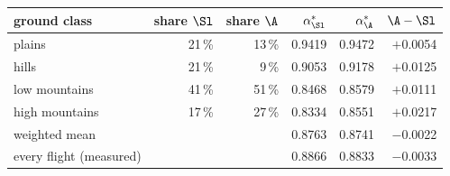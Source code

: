 \begin{tabular}{@{}l r r r r r@{}}
\toprule
ground class & share $\Sl$ & share $\A$ & $\alpha^*_\Sl$ & $\alpha^*_\A$ & $\A-\Sl$ \\
\midrule
plains & 21\,\% & 13\,\% & 0.9419 & 0.9472 & $+$0.0054 \\
hills & 21\,\% & 9\,\% & 0.9053 & 0.9178 & $+$0.0125 \\
low mountains & 41\,\% & 51\,\% & 0.8468 & 0.8579 & $+$0.0111 \\
high mountains & 17\,\% & 27\,\% & 0.8334 & 0.8551 & $+$0.0217 \\
\midrule
weighted mean & & & 0.8763 & 0.8741 & $-$0.0022 \\
every flight (measured) & & & 0.8866 & 0.8833 & $-$0.0033 \\
\bottomrule
\end{tabular}

